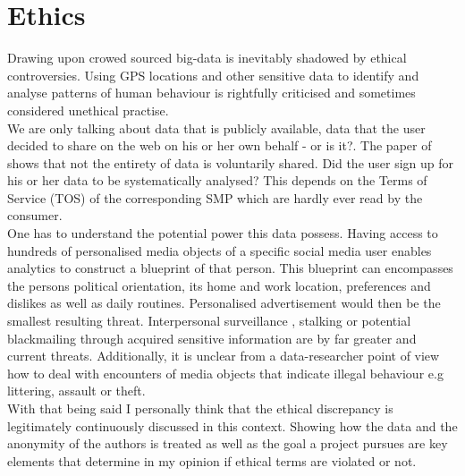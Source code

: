 \section{Ethics}

Drawing upon crowed sourced big-data is inevitably shadowed by ethical controversies. Using GPS locations and other sensitive data to identify and analyse patterns of human behaviour is rightfully criticised and sometimes considered unethical practise.\\
We are only talking about data that is publicly available, data that the user decided to share on the web on his or her own behalf - or is it?. The paper of \parencite{Estima2016} shows that not the entirety of data is voluntarily shared. Did the user sign up for his or her data to be systematically analysed? This depends on the Terms of Service (TOS) of the corresponding SMP which are hardly ever read by the consumer.\\
One has to understand the potential power this data possess. Having access to hundreds of personalised media objects of a specific social media user enables analytics to construct a blueprint of that person. This blueprint can encompasses the persons political orientation, its home and work location, preferences and dislikes as well as daily routines. Personalised advertisement would then be the smallest resulting threat. Interpersonal surveillance \parencite{Trottier2017}, stalking \parencite{Lyndon2011} or potential blackmailing through acquired sensitive information are by far greater and current threats. Additionally, it is unclear from a data-researcher point of view how to deal with encounters of media objects that indicate illegal behaviour e.g littering, assault or theft.\\

With that being said I personally think that the ethical discrepancy is legitimately continuously discussed in this context. Showing how the data and the anonymity of the authors is treated as well as the goal a project pursues are key elements that determine in my opinion if ethical terms are violated or not. 






